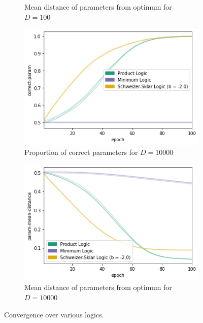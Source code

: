 \begin{figure}[h]
\begin{subfigure}[t]{0.45\textwidth}
        \caption{Mean distance of parameters from optimum for ${D=100}$}
        \label{fig:conjconvpmdd100}
    \end{subfigure}
    \begin{subfigure}[t]{0.45\textwidth}
        \centering
        \includegraphics[width=\textwidth]{imgs/conj-cp-10000dim-keep50-5t.png}
        \caption{Proportion of correct parameters for $D=10000$}
        \label{fig:conjconvcpd10000}
    \end{subfigure}
    \begin{subfigure}[t]{0.45\textwidth}
        \centering
        \includegraphics[width=\textwidth]{imgs/conj-pmd-10000dim-keep50-5t.png}
        \caption{Mean distance of parameters from optimum for ${D=10000}$}
        \label{fig:conjconvpmdd10000}
    \end{subfigure}
       \caption{Convergence over various logics.}
       \label{fig:conjconvlogics}
\end{figure}

